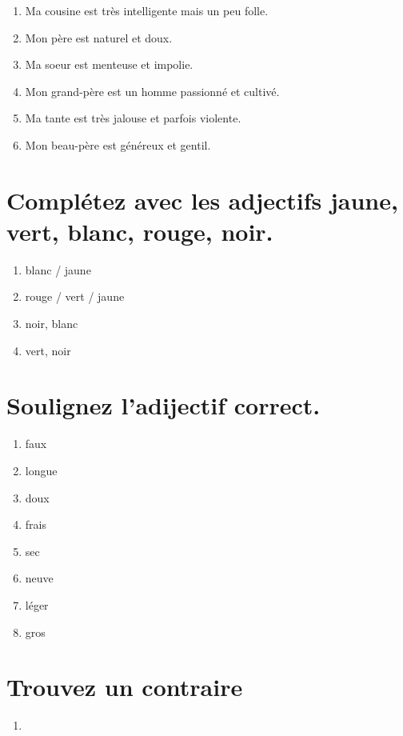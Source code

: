 \begin{enumerate}
    \item Ma cousine est très intelligente mais un peu folle.
    \item Mon père est naturel et doux.
    \item Ma soeur est menteuse et impolie.
    \item Mon grand-père est un homme passionné et cultivé.
    \item Ma tante est très jalouse et parfois violente.
    \item Mon beau-père est généreux et gentil.
\end{enumerate}

\section{Complétez avec les adjectifs jaune, vert, blanc, rouge, noir.}

\begin{enumerate}
    \item blanc / jaune
    \item rouge / vert / jaune
    \item noir, blanc
    \item vert, noir
\end{enumerate}

\section{Soulignez l'adijectif correct.}

\begin{enumerate}
    \item faux
    \item longue
    \item doux
    \item frais 
    \item sec 
    \item neuve
    \item léger 
    \item gros
\end{enumerate}

\section{Trouvez un contraire}

\begin{enumerate}
    \item 
\end{enumerate}

